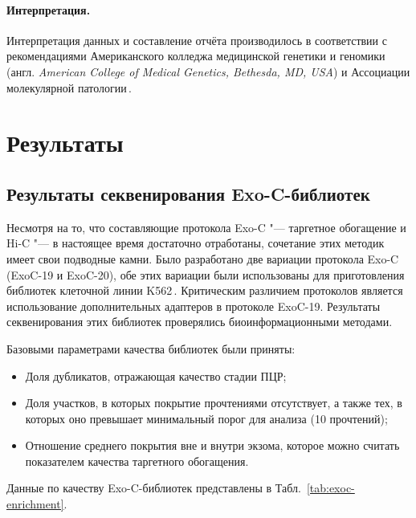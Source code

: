 \documentclass[a4paper,14pt]{extarticle}
\newcommand{\ecitep}[1]{\textenglish{\citep{#1}}}
\newcommand{\tableref}[1]{Табл.~\ref{#1}}
\newcommand{\engterm}[1]{англ. \textenglish{\textit{#1}}}
\begin{document}
\paragraph{Интерпретация.}
Интерпретация данных и составление отчёта производилось в соответствии с рекомендациями Американского колледжа медицинской генетики и геномики (\engterm{American College of Medical Genetics, Bethesda, MD, USA}) и Ассоциации молекулярной патологии\,\ecitep{Richards_2015}.

\section{Результаты}

\subsection{Результаты секвенирования Exo-C\hyp{}библиотек}

Несмотря на то, что составляющие протокола Exo-C "--- таргетное обогащение и Hi-C "--- в настоящее время достаточно отработаны, сочетание этих методик имеет свои подводные камни.
Было разработано две вариации протокола Exo-C (ExoC-19 и ExoC-20), обе этих вариации были использованы для приготовления библиотек клеточной линии K562\,\ecitep{Ma_2018,Ramani_2016,Gridina_2021}.
Критическим различием протоколов является использование дополнительных адаптеров в протоколе ExoC-19.
Результаты секвенирования этих библиотек проверялись биоинформационными методами.

Базовыми параметрами качества библиотек были приняты:

\begin{itemize}
	\item Доля дубликатов, отражающая качество стадии ПЦР;
	\item Доля участков, в которых покрытие прочтениями отсутствует, а также тех, в которых оно превышает минимальный порог для анализа (10 прочтений);
	\item Отношение среднего покрытия вне и внутри экзома, которое можно считать показателем качества таргетного обогащения.
\end{itemize}

Данные по качеству Exo-C\hyp{}библиотек представлены в \tableref{tab:exoc-enrichment}.
\end{document}
